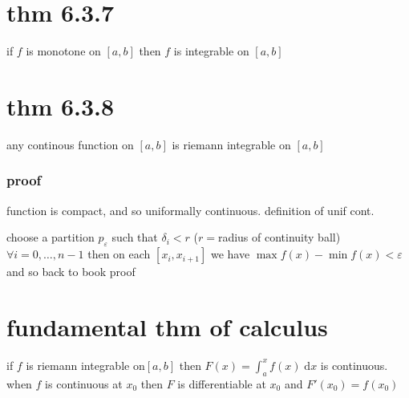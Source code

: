 \documentclass[letterpaper]{article}
\begin{document}
\section*{thm 6.3.7}
if $f$ is monotone on $[a,b]$ then $f$ is integrable on $[a,b]$
\section*{thm 6.3.8}
any continous function on $[a,b]$ is riemann integrable on $[a,b]$

\subsubsection*{proof}
function is compact, and so uniformally continuous. definition of unif cont.

choose a partition $p_\varepsilon$ such that $\delta_i<r$ ($r=$radius of continuity ball) $\forall i=0,\dots,n-1$ then on each $[x_i,x_{i+1}]$ we have $\max f(x)-\min f(x)<\varepsilon$ and so back to book proof


\section*{fundamental thm of calculus}
if $f$ is riemann integrable on$[a,b]$ then $F(x)=\int_a^x{f(x)\;\mathrm{d}x}$ is continuous. when $f$ is continuous at $x_0$ then $F$ is differentiable at $x_0$ and $F'(x_0)=f(x_0)$
\end{document}
